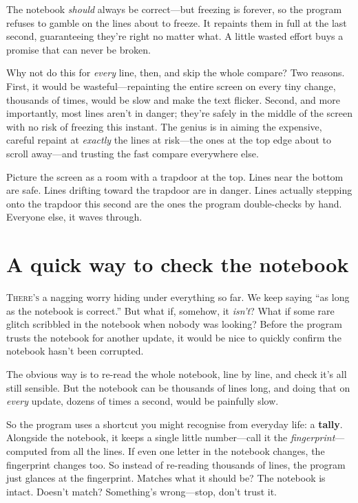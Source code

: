 \documentclass[11pt,twoside]{book}
\begin{document}
\begin{insight}
The notebook \emph{should} always be correct---but freezing is forever, so
the program refuses to gamble on the lines about to freeze. It repaints them
in full at the last second, guaranteeing they're right no matter what. A
little wasted effort buys a promise that can never be broken.
\end{insight}

Why not do this for \emph{every} line, then, and skip the whole compare? Two
reasons. First, it would be wasteful---repainting the entire screen on every
tiny change, thousands of times, would be slow and make the text flicker.
Second, and more importantly, most lines aren't in danger; they're safely in
the middle of the screen with no risk of freezing this instant. The genius is
in aiming the expensive, careful repaint at \emph{exactly} the lines at
risk---the ones at the top edge about to scroll away---and trusting the fast
compare everywhere else.

\begin{pic}
Picture the screen as a room with a trapdoor at the top. Lines near the
bottom are safe. Lines drifting toward the trapdoor are in danger. Lines
actually stepping onto the trapdoor this second are the ones the program
double-checks by hand. Everyone else, it waves through.
\end{pic}

\chapter{A quick way to check the notebook}
\lettrine{T}{here's} a nagging worry hiding under everything so far. We keep
saying ``as long as the notebook is correct.'' But what if, somehow, it
\emph{isn't}? What if some rare glitch scribbled in the notebook when nobody
was looking? Before the program trusts the notebook for another update, it
would be nice to quickly confirm the notebook hasn't been corrupted.

The obvious way is to re-read the whole notebook, line by line, and check
it's all still sensible. But the notebook can be thousands of lines long, and
doing that on \emph{every} update, dozens of times a second, would be
painfully slow.

So the program uses a shortcut you might recognise from everyday life: a
\textbf{tally}. Alongside the notebook, it keeps a single little number---call
it the \emph{fingerprint}---computed from all the lines. If even one letter in
the notebook changes, the fingerprint changes too. So instead of re-reading
thousands of lines, the program just glances at the fingerprint. Matches what
it should be? The notebook is intact. Doesn't match? Something's wrong---stop,
don't trust it.
\end{document}
